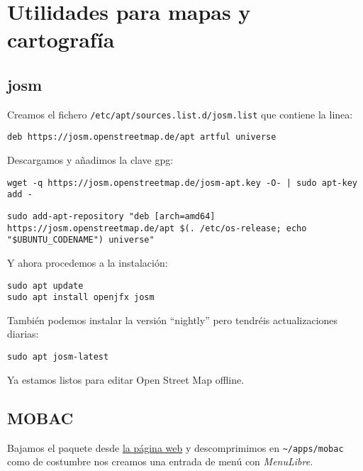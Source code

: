 \documentclass[
  12pt,
  spanish,
]{article}
\begin{document}
\hypertarget{utilidades-para-mapas-y-cartografuxeda}{%
\section{Utilidades para mapas y
cartografía}\label{utilidades-para-mapas-y-cartografuxeda}}

\hypertarget{josm}{%
\subsection{josm}\label{josm}}

Creamos el fichero \texttt{/etc/apt/sources.list.d/josm.list} que
contiene la linea:

\begin{verbatim}
deb https://josm.openstreetmap.de/apt artful universe
\end{verbatim}

Descargamos y añadimos la clave gpg:

\begin{verbatim}
wget -q https://josm.openstreetmap.de/josm-apt.key -O- | sudo apt-key add -
\end{verbatim}

\begin{verbatim}
sudo add-apt-repository "deb [arch=amd64] https://josm.openstreetmap.de/apt $(. /etc/os-release; echo "$UBUNTU_CODENAME") universe"
\end{verbatim}

Y ahora procedemos a la instalación:

\begin{verbatim}
sudo apt update
sudo apt install openjfx josm 
\end{verbatim}

También podemos instalar la versión ``nightly'' pero tendréis
actualizaciones diarias:

\begin{verbatim}
sudo apt josm-latest
\end{verbatim}

Ya estamos listos para editar Open Street Map offline.

\hypertarget{mobac}{%
\subsection{MOBAC}\label{mobac}}

Bajamos el paquete desde \href{http://mobac.sourceforge.net/}{la página
web} y descomprimimos en \texttt{\textasciitilde{}/apps/mobac} como de
costumbre nos creamos una entrada de menú con \emph{MenuLibre}.
\end{document}
